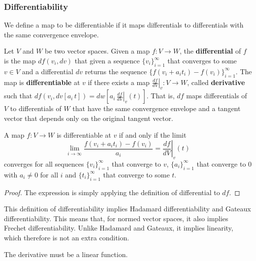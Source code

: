 \documentclass[11pt,letterpaper,fleqn]{memoir}
\begin{document}
\fi

\subsubsection{Differentiability}

We define a map to be differentiable if it maps differentials to differentials with the same convergence envelope.

\begin{defn}
	Let $V$ and $W$ be two vector spaces. Given a map $f: V \to W$, the \textbf{differential} of $f$ is the map $df(v_i, dv)$ that given a sequence $\{v_i\}_{i=1}^{\infty}$ that converges to some $v \in V$ and a differential $dv$ returns the sequence $\{f(v_i + a_i t_i) - f(v_i)\}_{i=1}^{\infty}$. The map is \textbf{differentiable} at $v$ if there exists a map $\left.\frac{df}{dV} \right|_{v}: V \to W$, called \textbf{derivative} such that $df(v_i, dv[a_i \, t]) = dw[a_i \, \left.\frac{df}{dV} \right|_{v} (t)]$. That is, $df$ maps differentials of $V$ to differentials of $W$ that have the same convergence envelope and a tangent vector that depends only on the original tangent vector.
\end{defn}

\begin{prop}
	A map $f : V \to W$ is differentiable at $v$ if and only if the limit
	$$ \lim\limits_{i \to \infty} \frac{f(v_i + a_i t_i) - f(v_i)}{a_i} = \left.\frac{df}{dV} \right|_{v} (t)$$
	converges for all sequences $\{v_i\}_{i=1}^{\infty}$ that converge to $v$, $\{a_i\}_{i=1}^{\infty}$ that converge to $0$ with $a_i \neq 0$ for all $i$ and $\{t_i\}_{i=1}^{\infty}$ that converge to some $t$.
\end{prop}

\begin{proof}
	The expression is simply applying the definition of differential to $df$.
\end{proof}

\begin{remark}
	This definition of differentiability implies Hadamard differentiability and Gateaux differentiability. This means that, for normed vector spaces, it also implies Frechet differentiability. Unlike Hadamard and Gateaux, it implies linearity, which therefore is not an extra condition.
\end{remark}

\begin{prop}
	The derivative must be a linear function.
\end{prop}
\end{document}

